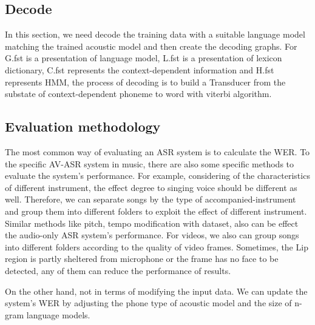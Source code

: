 \subsection{Decode}
In this section, we need decode the training data with a suitable language model matching the trained acoustic model and then create the decoding graphs. For G.fst is a presentation of language model, L.fst is a presentation of lexicon dictionary, C.fst represents the context-dependent information and H.fst represents HMM, the process of decoding is to build a Transducer from the substate of context-dependent phoneme to word with viterbi algorithm.

\subsection{Evaluation methodology}

The most common way of evaluating an ASR system is to calculate the WER. To the specific AV-ASR system in music, there are also some specific methods to evaluate the system’s performance. For example, considering of the characteristics of different instrument, the effect degree to singing voice should be different as well. Therefore, we can separate songs by the type of accompanied-instrument and group them into different folders to exploit the effect of different instrument. Similar methods like pitch, tempo modification with dataset, also can be effect the audio-only ASR system's performance. For videos, we also can group songs into different folders according to the quality of video frames. Sometimes, the Lip region is partly sheltered from microphone or the frame has no face to be detected, any of them can reduce the performance of results. 

On the other hand, not in terms of modifying the input data. We can update the system's WER by adjusting the phone type of acoustic model and the size of n-gram language models. 





